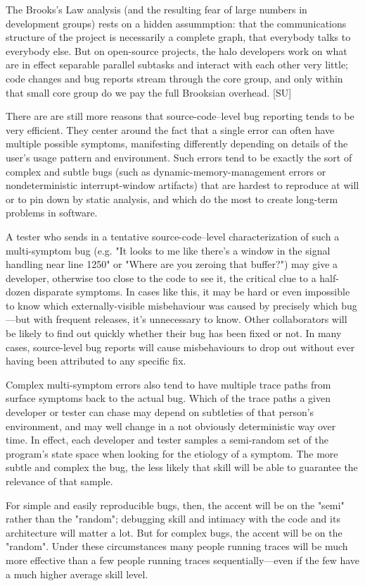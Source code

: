 \documentclass[a4paper,12pt,UTF8,twoside]{ctexbook}
\begin{document}
The Brooks's Law analysis (and the resulting fear of large numbers in development groups) rests on a hidden assummption: that the communications structure of the project is necessarily a complete graph, that everybody talks to everybody else. But on open-source projects, the halo developers work on what are in effect separable parallel subtasks and interact with each other very little; code changes and bug reports stream through the core group, and only within that small core group do we pay the full Brooksian overhead. [SU]

There are are still more reasons that source-code–level bug reporting tends to be very efficient. They center around the fact that a single error can often have multiple possible symptoms, manifesting differently depending on details of the user's usage pattern and environment. Such errors tend to be exactly the sort of complex and subtle bugs (such as dynamic-memory-management errors or nondeterministic interrupt-window artifacts) that are hardest to reproduce at will or to pin down by static analysis, and which do the most to create long-term problems in software.

A tester who sends in a tentative source-code–level characterization of such a multi-symptom bug (e.g. "It looks to me like there's a window in the signal handling near line 1250" or "Where are you zeroing that buffer?") may give a developer, otherwise too close to the code to see it, the critical clue to a half-dozen disparate symptoms. In cases like this, it may be hard or even impossible to know which externally-visible misbehaviour was caused by precisely which bug—but with frequent releases, it's unnecessary to know. Other collaborators will be likely to find out quickly whether their bug has been fixed or not. In many cases, source-level bug reports will cause misbehaviours to drop out without ever having been attributed to any specific fix.

Complex multi-symptom errors also tend to have multiple trace paths from surface symptoms back to the actual bug. Which of the trace paths a given developer or tester can chase may depend on subtleties of that person's environment, and may well change in a not obviously deterministic way over time. In effect, each developer and tester samples a semi-random set of the program's state space when looking for the etiology of a symptom. The more subtle and complex the bug, the less likely that skill will be able to guarantee the relevance of that sample.

For simple and easily reproducible bugs, then, the accent will be on the "semi" rather than the "random"; debugging skill and intimacy with the code and its architecture will matter a lot. But for complex bugs, the accent will be on the "random". Under these circumstances many people running traces will be much more effective than a few people running traces sequentially—even if the few have a much higher average skill level.
\end{document}
